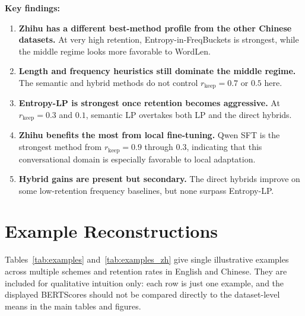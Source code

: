 \documentclass[11pt]{article}
\newcommand{\rkeep}{r_{\mathrm{keep}}}
\begin{document}
\textbf{Key findings:}
\begin{enumerate}
    \item \textbf{Zhihu has a different best-method profile from the other Chinese datasets.} At very high retention, Entropy-in-FreqBuckets is strongest, while the middle regime looks more favorable to WordLen.
    \item \textbf{Length and frequency heuristics still dominate the middle regime.} The semantic and hybrid methods do not control $\rkeep=0.7$ or $0.5$ here.
    \item \textbf{Entropy-LP is strongest once retention becomes aggressive.} At $\rkeep=0.3$ and $0.1$, semantic LP overtakes both LP and the direct hybrids.
    \item \textbf{Zhihu benefits the most from local fine-tuning.} Qwen SFT is the strongest method from $\rkeep=0.9$ through $0.3$, indicating that this conversational domain is especially favorable to local adaptation.
    \item \textbf{Hybrid gains are present but secondary.} The direct hybrids improve on some low-retention frequency baselines, but none surpass Entropy-LP.
\end{enumerate}

\section{Example Reconstructions}
\label{app:examples}

Tables~\ref{tab:examples} and~\ref{tab:examples_zh} give single illustrative
examples across multiple schemes and retention rates in English and Chinese.
They are included for qualitative intuition only: each row is just one example,
and the displayed BERTScores should not be compared directly to the dataset-level
means in the main tables and figures.
\end{document}
